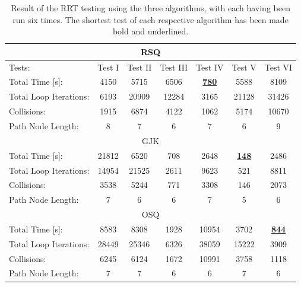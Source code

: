 


\begin{table}[h!]
	\centering
	\caption{Result of the RRT testing using the three algorithms, with each having been run six times. The shortest test of each respective algorithm has been made bold and underlined.}
	\begin{tabular}{|l|c|c|c|c|c|c|}
		\hline
		\multicolumn{7}{|c|}{R\gls{SQ}} \\ \hline
		Tests:					&	Test I		&	Test II		&	Test III	&	Test IV		&	Test V		&	Test VI	\\ \hline
		Total Time {[}s{]}:		&	4150		&	5715		&	6506		&	\underline{\textbf{780}}			&	5588		&	8109 	\\ \hline
		Total Loop Iterations: 	&	6193		&	20909		&	12284		&	3165		&	21128		&	31426	\\ \hline
		Collisions:				&	1915		&	6874		&	4122		&	1062		&	5174		&	10670 	\\ \hline
		Path Node Length:		&	8			&	7			&		6		&		7		&		6		&	9		\\ \hline
		\multicolumn{7}{|c|}{\gls{GJK}} \\ \hline
		Total Time {[}s{]}:		&	21812		&	6520		&	708			&	2648		&	\underline{\textbf{148}}			&	2486	\\ \hline
		Total Loop Iterations: 	&	14954		&	21525		&	2611		&	9623		&	521			&	8811	\\ \hline
		Collisions:				&	3538		&	5244		&	771			&	3308		&	146			&	2073	\\ \hline
		Path Node Length:		&	7			&	6			&	6			&	7			&	5			&	6		\\ \hline
		\multicolumn{7}{|c|}{O\gls{SQ}} \\ \hline
		Total Time {[}s{]}:		&	8583		&	8308		&	1928		&	10954		&	3702		&	\underline{\textbf{844}}		\\ \hline
		Total Loop Iterations: 	&	28449		&	25346		&	6326		&	38059		&	15222		&	3909	\\ \hline
		Collisions:				&	6245		&	6124		&	1672		&	10991		&	3758		&	1118	\\ \hline
		Path Node Length:		&	7			&	7			&	6			&	6			&	7			&	6			\\ \hline
	\end{tabular}

	\label{Table:RRT_all}
\end{table}

